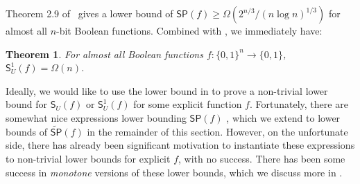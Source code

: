 \documentclass[11pt]{article}
\numberwithin{equation}{section}
\newtheorem{theorem}{Theorem}[section]
\theoremstyle{definition}
\theoremstyle{plain}
\begin{document}
Theorem 2.9 of~\cite{BGW99} gives a lower bound of $\mathsf{SP}(f)\geq \Omega(2^{n/3}/(n\log n)^{1/3})$ for almost all $n$-bit Boolean functions. Combined with , we immediately have:
\begin{theorem}\label{thm:almost-all}
For almost all Boolean functions $f:\{0,1\}^n\rightarrow\{0,1\}$, $\mathsf{S}_U^1(f)=\Omega(n)$.
\end{theorem}

Ideally, we would like to use the lower bound in  to prove a non-trivial lower bound for ${\mathsf{S}_U}(f)$ or $\mathsf{S}_U^1(f)$ for some %
explicit function  %
$f$. Fortunately, there are somewhat nice expressions lower bounding $\mathsf{SP}(f)$ \cite{Raz90,Gal01}, which we extend to lower bounds of $\widetilde{\mathsf{SP}}(f)$ in the remainder of this section. However, on the unfortunate side, there has already been significant motivation to instantiate these expressions to non-trivial lower bounds for %
explicit  %
$f$, with no success. There has been some success in \emph{monotone} versions of these lower bounds, which we discuss more in .



\vskip10pt
\end{document}
